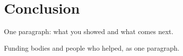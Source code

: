 \documentclass[acmsmall]{acmart}
\begin{document}
\section{Conclusion}
One paragraph: what you showed and what comes next.

\begin{acks}
Funding bodies and people who helped, as one paragraph.
\end{acks}




\end{document}
